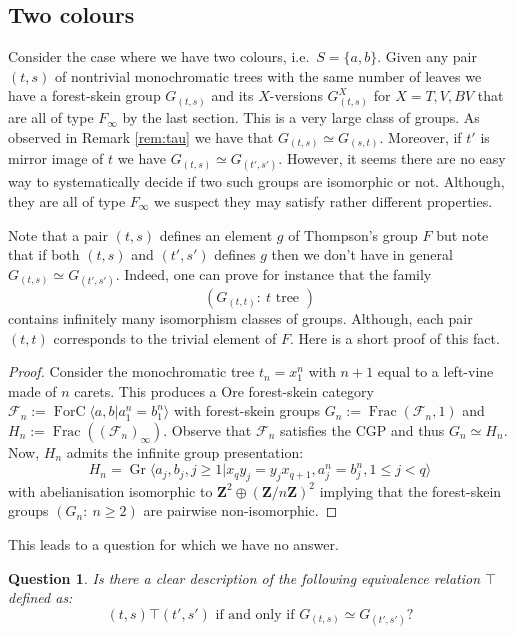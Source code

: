 \documentclass[a4paper, 12pt]{amsart}
\numberwithin{equation}{section}
\newtheorem{question}[theorem]{Question}
\theoremstyle{definition}
\newcommand{\cF}{\mathcal F}
\DeclareMathOperator{\Frac}{Frac}
\DeclareMathOperator{\FC}{ForC}
\DeclareMathOperator{\Gr}{Gr}
\newcommand{\la}{\langle}
\newcommand{\ra}{\rangle}
\newcommand{\Z}{\mathbf{Z}}
\begin{document}
\subsection{Two colours}\label{sec:two-colours}
Consider the case where we have two colours, i.e.~$S=\{a,b\}$.
Given any pair $(t,s)$ of nontrivial monochromatic trees with the same number of leaves we have a forest-skein group $G_{(t,s)}$ and its $X$-versions $G_{(t,s)}^X$ for $X=T,V,BV$ that are all of type $F_\infty$ by the last section.
This is a very large class of groups. 
As observed in Remark \ref{rem:tau} we have that $G_{(t,s)}\simeq G_{(s,t)}$. 
Moreover, if $t'$ is mirror image of $t$ we have $G_{(t,s)}\simeq G_{(t',s')}.$
However, it seems there are no easy way to systematically decide if two such groups are isomorphic or not. 
Although, they are all of type $F_\infty$ we suspect they may satisfy rather different properties.

Note that a pair $(t,s)$ defines an element $g$ of Thompson's group $F$ but note that if both $(t,s)$ and $(t',s')$ defines $g$ then we don't have in general $G_{(t,s)}\simeq G_{(t',s')}.$
Indeed, one can prove for instance that the family $$(G_{(t,t)}:\ t \text{ tree } )$$
contains infinitely many isomorphism classes of groups.
Although, each pair $(t,t)$ corresponds to the trivial element of $F$.
Here is a short proof of this fact.
\begin{proof}
Consider the monochromatic tree $t_n = x_1^n$ with $n+1$ equal to a left-vine made of $n$ carets.
This produces a Ore forest-skein category $\cF_n:=\FC\la a,b| a_1^n=b_1^n\ra$ with forest-skein groups $G_n:=\Frac(\cF_n,1)$ and $H_n:=\Frac((\cF_n)_\infty)$.
Observe that $\cF_n$ satisfies the CGP and thus $G_n\simeq H_n$.
Now, $H_n$ admits the infinite group presentation:
$$H_n=\Gr\langle a_j,b_j, j\geq 1 | x_q y_j = y_j x_{q+1}, a_j^n=b_j^n, 1\leq j<q\rangle$$
with abelianisation isomorphic to $\Z^2 \oplus (\Z/n\Z)^2$
implying that the forest-skein groups $(G_n:\ n\geq 2)$ are pairwise non-isomorphic.
\end{proof}

This leads to a question for which we have no answer.

\begin{question}
Is there a clear description of the following equivalence relation $\top$ defined as:
$$(t,s)\top (t',s') \text{ if and only if } G_{(t,s)}\simeq G_{(t',s')}?$$
\end{question}
\end{document}
